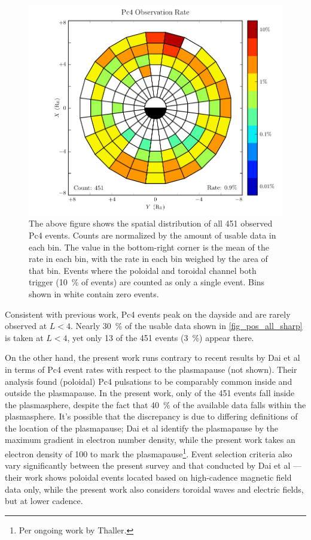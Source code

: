 \begin{figure}[!htb]
  \centering
  \includegraphics[width=\textwidth]{figures/rate_all_sharp.pdf}
  \caption[Rate of Pc4 Events]{
    The above figure shows the spatial distribution of all 451 observed Pc4
    events. Counts are normalized by the amount of usable data in each bin. The
    value in the bottom-right corner is the mean of the rate in each bin, with
    the rate in each bin weighed by the area of that bin. Events where the
    poloidal and toroidal channel both trigger (\about\SI{10}{\percent} of
    events) are counted as only a single event. Bins shown in white contain
    zero events. 
  }
  \label{fig_rate_all_sharp}
\end{figure}

Consistent with previous
work\cite{anderson_1990,dai_2015,kokubun_1989,liu_2009}, Pc4 events peak on the
dayside and are rarely
observed at $L < 4$. Nearly \SI{30}{\percent} of the usable data shown in
\cref{fig_pos_all_sharp} is taken at $L < 4$, yet only 13 of the 451 events
(\SI{3}{\percent}) appear there. 

On the other hand, the present work runs contrary to recent results by Dai et
al in terms
of Pc4 event rates with respect to the plasmapause (not shown). Their analysis
found (poloidal) Pc4 pulsations to be comparably common inside and outside the
plasmapause\cite{dai_2015}. In the present work, only  of the 451 events
 fall inside the plasmasphere, despite the fact that
\SI{40}{\percent} of the available data falls within the plasmasphere. 
It's possible that the discrepancy is due to differing definitions of the
location of the plasmapause; Dai et al
identify the plasmapause by the maximum gradient in electron number density,
while the present work takes an electron density of \SI{100}{\percc} to mark
the plasmapause\footnote{Per ongoing work by Thaller. }. Event selection
criteria also vary significantly between the present survey and that conducted
by Dai et al --- their work shows poloidal events located based on high-cadence
magnetic field data only, while the present work also considers toroidal waves
and electric fields, but at lower cadence. 

